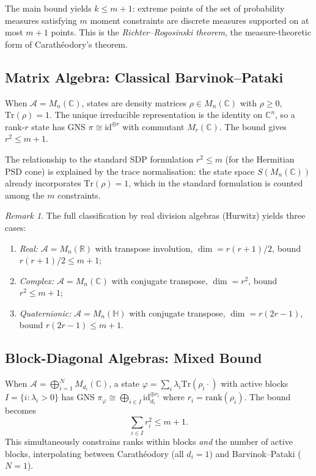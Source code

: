 \documentclass[11pt,a4paper]{article}
\theoremstyle{plain}
\theoremstyle{definition}
\theoremstyle{remark}
\newtheorem{remark}[theorem]{Remark}
\newcommand{\R}{\mathbb{R}}
\newcommand{\C}{\mathbb{C}}
\newcommand{\tr}{\mathrm{Tr}}
\newcommand{\rank}{\mathrm{rank}}
\begin{document}
The main bound yields $k \le m + 1$: extreme points of the set of
probability measures satisfying $m$ moment constraints are discrete
measures supported on at most $m + 1$ points. This is the
\emph{Richter--Rogosinski theorem}, the measure-theoretic form of
Carath\'eodory's theorem.

\subsection{Matrix Algebra: Classical Barvinok--Pataki}
\label{sec:classical-bp}

When $\mathcal{A} = M_n(\C)$, states are density matrices
$\rho \in M_n(\C)$ with $\rho \ge 0$, $\tr(\rho) = 1$.
The unique irreducible representation is the identity on $\C^n$,
so a rank-$r$ state has GNS $\pi \cong \mathrm{id}^{\oplus r}$
with commutant $M_r(\C)$.
The bound gives $r^2 \le m + 1$.

The relationship to the standard SDP formulation $r^2 \le m$ (for the
Hermitian PSD cone) is explained by the trace normalisation: the state
space $S(M_n(\C))$ already incorporates $\tr(\rho) = 1$, which in
the standard formulation is counted among the $m$ constraints.

\begin{remark}
The full classification by real division algebras (Hurwitz) yields
three cases:
\begin{enumerate}[label=(\arabic*)]
  \item \emph{Real:} $\mathcal{A} = M_n(\R)$ with transpose involution,
        $\dim = r(r+1)/2$, bound $r(r+1)/2 \le m + 1$;
  \item \emph{Complex:} $\mathcal{A} = M_n(\C)$ with conjugate transpose,
        $\dim = r^2$, bound $r^2 \le m + 1$;
  \item \emph{Quaternionic:} $\mathcal{A} = M_n(\mathbb{H})$ with
        conjugate transpose, $\dim = r(2r-1)$, bound $r(2r-1) \le m + 1$.
\end{enumerate}
\end{remark}

\subsection{Block-Diagonal Algebras: Mixed Bound}
\label{sec:block-diagonal}

When $\mathcal{A} = \bigoplus_{i=1}^N M_{d_i}(\C)$, a state
$\varphi = \sum_i \lambda_i \tr(\rho_i \cdot)$ with active blocks
$I = \{i : \lambda_i > 0\}$ has GNS
$\pi_\varphi \cong \bigoplus_{i \in I} \mathrm{id}_{d_i}^{\oplus r_i}$
where $r_i = \rank(\rho_i)$. The bound becomes
\[
  \sum_{i \in I} r_i^2 \le m + 1.
\]
This simultaneously constrains ranks within blocks \emph{and} the number
of active blocks, interpolating between Carath\'eodory (all $d_i = 1$)
and Barvinok--Pataki ($N = 1$).
\end{document}
